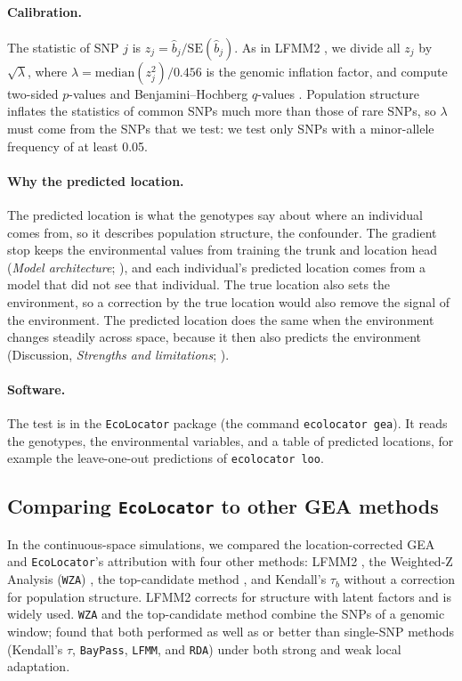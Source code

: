 \documentclass[]{article}
\newcommand{\ecolocator}{\texttt{EcoLocator}\xspace}
\begin{document}
\paragraph{Calibration.}
The statistic of SNP $j$ is $z_j = \hat{b}_j / \mathrm{SE}(\hat{b}_j)$.
As in LFMM2 \citep{caye_lfmm2_2019},
we divide all $z_j$ by $\sqrt{\lambda}$,
where $\lambda = \mathrm{median}(z_j^2) / 0.456$
is the genomic inflation factor,
and compute two-sided $p$-values
and Benjamini--Hochberg $q$-values \citep{benjamini_hochberg_1995}.
Population structure inflates the statistics of common SNPs
much more than those of rare SNPs,
so $\lambda$ must come from the SNPs that we test:
we test only SNPs with a minor-allele frequency of at least 0.05.

\paragraph{Why the predicted location.}
The predicted location is what the genotypes say
about where an individual comes from,
so it describes population structure, the confounder.
The gradient stop keeps the environmental values from training the trunk
and location head (\textit{Model architecture}; ),
and each individual's predicted location comes from a model
that did not see that individual.
The true location also sets the environment,
so a correction by the true location
would also remove the signal of the environment.
The predicted location does the same
when the environment changes steadily across space,
because it then also predicts the environment
(Discussion, \textit{Strengths and limitations}; ).

\paragraph{Software.}
The test is in the \ecolocator package
(the command \texttt{ecolocator gea}).
It reads the genotypes, the environmental variables,
and a table of predicted locations,
for example the leave-one-out predictions of \texttt{ecolocator loo}.

\subsection{Comparing \ecolocator to other GEA methods}
\label{sec:comparison}

In the continuous-space simulations,
we compared the location-corrected GEA and \ecolocator's attribution
with four other methods:
LFMM2 \citep{caye_lfmm2_2019},
the Weighted-Z Analysis (\texttt{WZA}) \citep{booker_wza_2024},
the top-candidate method \citep{yeaman_convergent_2016},
and Kendall's $\tau_b$ without a correction for population structure.
LFMM2 corrects for structure with latent factors and is widely used.
\texttt{WZA} and the top-candidate method combine the SNPs of a genomic window;
\citet{booker_wza_2024} found that both performed as well as or better than
single-SNP methods (Kendall's $\tau$, \texttt{BayPass}, \texttt{LFMM}, and \texttt{RDA})
under both strong and weak local adaptation.
\end{document}
